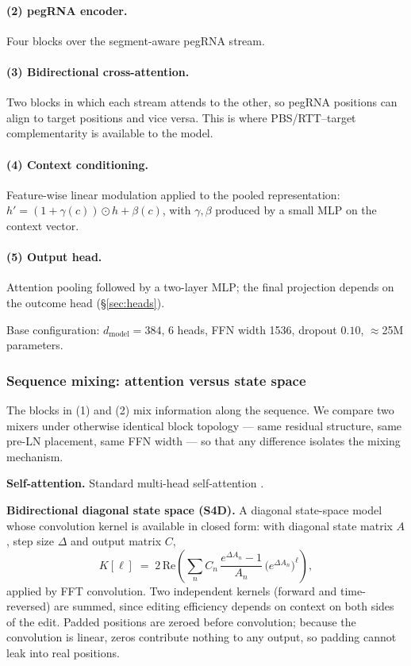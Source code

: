 \documentclass[11pt]{article}
\begin{document}
\paragraph{(2) pegRNA encoder.} Four blocks over the segment-aware pegRNA stream.

\paragraph{(3) Bidirectional cross-attention.} Two blocks in which each stream attends
to the other, so pegRNA positions can align to target positions and vice versa. This
is where PBS/RTT--target complementarity is available to the model.

\paragraph{(4) Context conditioning.} Feature-wise linear modulation
\citep[FiLM,][]{perez2018} applied to the pooled representation:
$h' = (1+\gamma(c))\odot h + \beta(c)$, with $\gamma,\beta$ produced by a small MLP on
the context vector.

\paragraph{(5) Output head.} Attention pooling followed by a two-layer MLP; the final
projection depends on the outcome head (\S\ref{sec:heads}).

Base configuration: $d_{\mathrm{model}}=384$, 6 heads, FFN width 1536, dropout $0.10$,
$\approx$25M parameters.

\subsubsection{Sequence mixing: attention versus state space}
\label{sec:mixer}

The blocks in (1) and (2) mix information along the sequence. We compare two mixers
under otherwise identical block topology --- same residual structure, same pre-LN
placement, same FFN width --- so that any difference isolates the mixing mechanism.

\textbf{Self-attention.} Standard multi-head self-attention \citep{vaswani2017}.

\textbf{Bidirectional diagonal state space (S4D).} A diagonal state-space model
\citep{gu2022s4,gu2022s4d} whose convolution kernel is available in closed form: with
diagonal state matrix $A$, step size $\Delta$ and output matrix $C$,
\begin{equation}
K[\ell] \;=\; 2\,\mathrm{Re}\!\left(\sum_n C_n\,
\frac{e^{\Delta A_n}-1}{A_n}\,\bigl(e^{\Delta A_n}\bigr)^{\ell}\right),
\label{eq:s4d}
\end{equation}
applied by FFT convolution. Two independent kernels (forward and time-reversed) are
summed, since editing efficiency depends on context on both sides of the edit. Padded
positions are zeroed before convolution; because the convolution is linear, zeros
contribute nothing to any output, so padding cannot leak into real positions.
\end{document}

